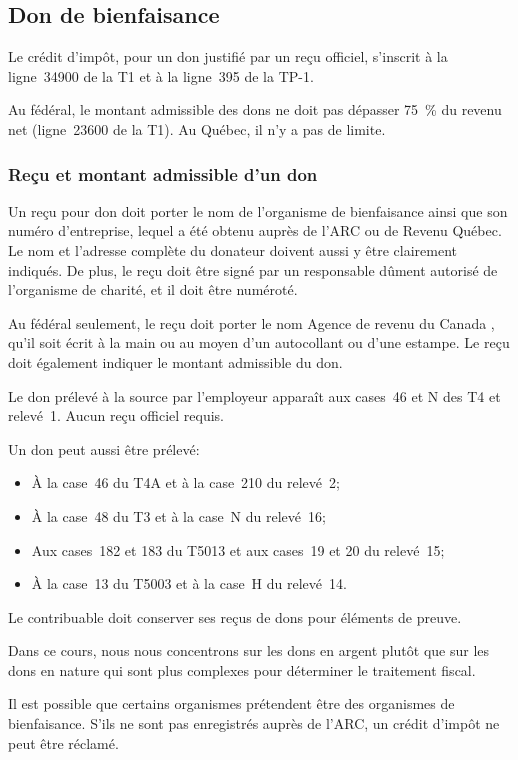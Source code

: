 \subsection{Don de bienfaisance}
Le crédit d'impôt, pour un don justifié par un reçu officiel, s'inscrit à la ligne~34900 de la T1 et à la ligne~395 de la TP-1. 

Au fédéral, le montant admissible des dons ne doit pas dépasser 75~\% du revenu net (ligne~23600 de la T1). Au Québec, il n'y a pas de limite.

\subsubsection{Reçu et montant admissible d'un don}
Un reçu pour don doit porter le nom de l'organisme de bienfaisance ainsi que son numéro d'entreprise, lequel a été obtenu auprès de l'ARC ou de Revenu Québec. Le nom et l'adresse complète du donateur doivent aussi y être clairement indiqués. De plus, le reçu doit être signé par un responsable dûment autorisé de l'organisme de charité, et il doit être numéroté.

Au fédéral seulement, le reçu doit porter le nom \og Agence de revenu du Canada \fg{}, qu'il soit écrit à la main ou au moyen d'un autocollant ou d'une estampe. Le reçu doit également indiquer le \og montant admissible \fg{} du don. 

Le don prélevé à la source par l'employeur apparaît aux cases~46 et N des T4 et relevé~1. Aucun reçu officiel requis.

Un don peut aussi être prélevé:
\begin{itemize}
	\item À la case~46 du T4A et à la case~210 du relevé~2;
	\item À la case~48 du T3 et à la case~N du relevé~16;
	\item Aux cases~182 et 183 du T5013 et aux cases~19 et 20 du relevé~15;
	\item À la case~13 du T5003 et à la case~H du relevé~14.
\end{itemize}

Le contribuable doit conserver ses reçus de dons pour éléments de preuve.

Dans ce cours, nous nous concentrons sur les dons en argent plutôt que sur les dons en nature qui sont plus complexes pour déterminer le traitement fiscal.

Il est possible que certains organismes prétendent être des organismes de bienfaisance. S'ils ne sont pas enregistrés auprès de l'ARC, un crédit d'impôt ne peut être réclamé.

